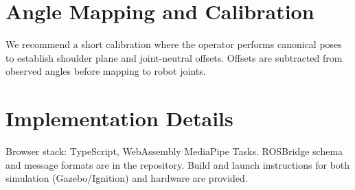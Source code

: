 \documentclass[manuscript,screen]{acmart} %
\begin{document}


\appendix
\section{Angle Mapping and Calibration}
We recommend a short calibration where the operator performs canonical poses to establish shoulder plane and joint-neutral offsets. Offsets are subtracted from observed angles before mapping to robot joints.

\section{Implementation Details}
Browser stack: TypeScript, WebAssembly MediaPipe Tasks. ROSBridge schema and message formats are in the repository. Build and launch instructions for both simulation (Gazebo/Ignition) and hardware are provided.
\end{document}
